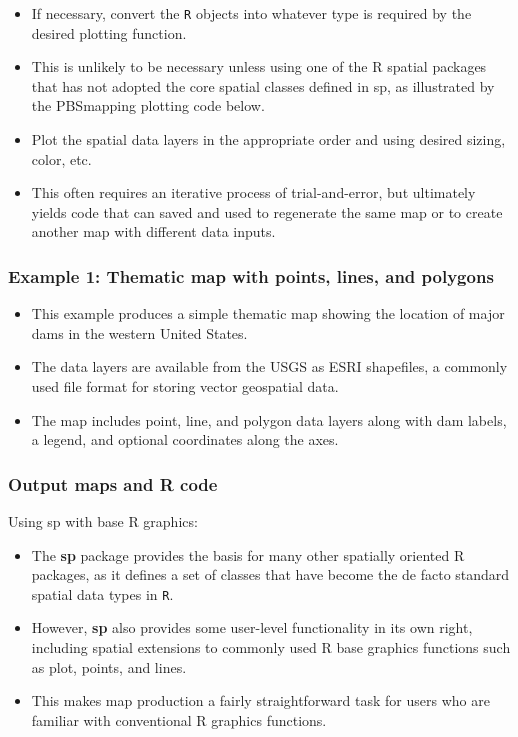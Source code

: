 \documentclass{beamer}
\begin{document}
\begin{frame}
\begin{itemize}
\item If necessary, convert the \texttt{R} objects into whatever type is required by the desired plotting function. 
\item This is unlikely to be necessary unless using one of the R spatial packages that has not adopted the core spatial classes defined in sp, as illustrated by the PBSmapping plotting code below.
\item Plot the spatial data layers in the appropriate order and using desired sizing, color, etc. 
\item This often requires an iterative process of trial-and-error, but ultimately yields code that can saved and used to regenerate the same map or to create another map with different data inputs.

\end{itemize}
\end{frame}
\begin{frame}
\frametitle{Example 1: Thematic map with points, lines, and polygons}

\begin{itemize}
\item This example produces a simple thematic map showing the location of major dams in the western United States. \item The data layers are available from the USGS as ESRI shapefiles, a commonly used file format for storing vector geospatial data. \item The map includes point, line, and polygon data layers along with dam labels, a legend, and optional coordinates along the axes.
\end{itemize}
\end{frame}
\begin{frame}
\frametitle{Output maps and R code}
Using sp with base R graphics:
\begin{itemize}
\item The \textbf{sp} package provides the basis for many other spatially oriented R packages, as it defines a set of classes that have become the de facto standard spatial data types in \texttt{R}. 
\end{itemize}
\end{frame}
\begin{frame}
\begin{itemize}
\item However, \textbf{sp} also provides some user-level functionality in its own right, including spatial extensions to commonly used R base graphics functions such as plot, points, and lines. 
\item This makes map production a fairly straightforward task for users who are familiar with conventional R graphics functions.
\end{itemize}
\end{frame}
\end{document}
